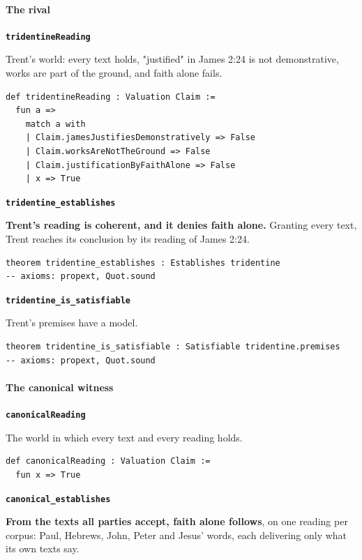 \documentclass[11pt]{article}
\begin{document}
\paragraph*{The rival}
\leavevmode\par
\par\medskip\noindent\textbf{\texttt{tridentine\allowbreak{}Reading}}\par\nobreak\noindent
Trent's world: every text holds, "justified" in James 2:24 is not demonstrative, works are part of the ground, and faith alone fails.

{\small\begin{verbatim}
def tridentineReading : Valuation Claim :=
  fun a =>
    match a with
    | Claim.jamesJustifiesDemonstratively => False
    | Claim.worksAreNotTheGround => False
    | Claim.justificationByFaithAlone => False
    | x => True
\end{verbatim}}
\par\medskip\noindent\textbf{\texttt{tridentine\_\allowbreak{}establishes}}\par\nobreak\noindent
\textbf{Trent's reading is coherent, and it denies faith alone.} Granting every text, Trent reaches its conclusion by its reading of James 2:24.

{\small\begin{verbatim}
theorem tridentine_establishes : Establishes tridentine
-- axioms: propext, Quot.sound
\end{verbatim}}
\par\medskip\noindent\textbf{\texttt{tridentine\_\allowbreak{}is\_\allowbreak{}satisfiable}}\par\nobreak\noindent
Trent's premises have a model.

{\small\begin{verbatim}
theorem tridentine_is_satisfiable : Satisfiable tridentine.premises
-- axioms: propext, Quot.sound
\end{verbatim}}
\paragraph*{The canonical witness}
\leavevmode\par
\par\medskip\noindent\textbf{\texttt{canonical\allowbreak{}Reading}}\par\nobreak\noindent
The world in which every text and every reading holds.

{\small\begin{verbatim}
def canonicalReading : Valuation Claim :=
  fun x => True
\end{verbatim}}
\par\medskip\noindent\textbf{\texttt{canonical\_\allowbreak{}establishes}}\par\nobreak\noindent
\textbf{From the texts all parties accept, faith alone follows}, on one reading per corpus: Paul, Hebrews, John, Peter and Jesus' words, each delivering only what its own texts say.
\end{document}
